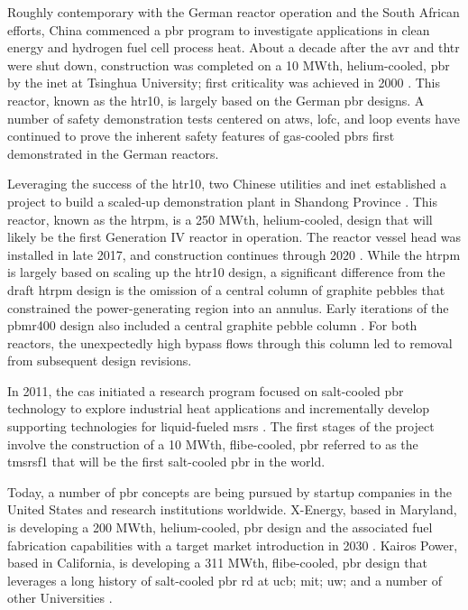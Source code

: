 Roughly contemporary with the German reactor operation and the South African efforts, China commenced a \gls{pbr} program to investigate applications in clean energy and hydrogen fuel cell process heat. About a decade after the \gls{avr} and \gls{thtr} were shut down, construction was completed on a 10 MWth, helium-cooled, \gls{pbr} by the \gls{inet} at Tsinghua University; first criticality was achieved in 2000 \cite{gao,chen_htr,xu_htr}. This reactor, known as the \gls{htr10}, is largely based on the German \gls{pbr} designs. A number of safety demonstration tests centered on \gls{atws}, \gls{lofc}, and \gls{loop} events have continued to prove the inherent safety features of gas-cooled \glspl{pbr} first demonstrated in the German reactors.

Leveraging the success of the \gls{htr10}, two Chinese utilities and \gls{inet} established a project to build a scaled-up demonstration plant in Shandong Province \cite{xu_htr,htrpm,htrpm_website}. This reactor, known as the \gls{htrpm}, is a 250 MWth, helium-cooled, design that will likely be the first Generation IV reactor in operation. The reactor vessel head was installed in late 2017, and construction continues through 2020 \cite{htrpm_2020}. While the \gls{htrpm} is largely based on scaling up the \gls{htr10} design, a significant difference from the draft \gls{htrpm} design is the omission of a central column of graphite pebbles that constrained the power-generating region into an annulus. Early iterations of the \gls{pbmr400} design also included a central graphite pebble column \cite{koster}. For both reactors, the unexpectedly high bypass flows through this column led to removal from subsequent design revisions.

In 2011, the \gls{cas} initiated a research program focused on salt-cooled \gls{pbr} technology to explore industrial heat applications and incrementally develop supporting technologies for liquid-fueled \glspl{msr} \cite{dai}. The first stages of the project involve the construction of a 10 MWth, \gls{flibe}-cooled, \gls{pbr} referred to as the \gls{tmsrsf1} that will be the first salt-cooled \gls{pbr} in the world. 

Today, a number of \gls{pbr} concepts are being pursued by startup companies in the United States and research institutions worldwide. X-Energy, based in Maryland, is developing a 200 MWth, helium-cooled, \gls{pbr} design and the associated fuel fabrication capabilities with a target market introduction in 2030 \cite{x_energy}. Kairos Power, based in California, is developing a 311 MWth, \gls{flibe}-cooled, \gls{pbr} design that leverages a long history of salt-cooled \gls{pbr} \gls{rd} at \gls{ucb}; \gls{mit}; \gls{uw}; and a number of other Universities \cite{kairos}. %

